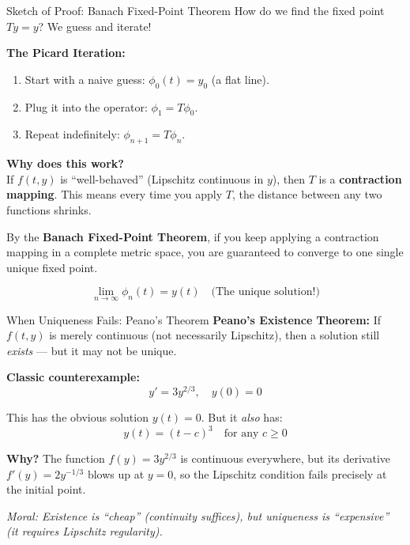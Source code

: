 \begin{frame}{Sketch of Proof: Banach Fixed-Point Theorem}
How do we find the fixed point $Ty = y$? We guess and iterate!

\textbf{The Picard Iteration:}
\begin{enumerate}
    \item Start with a naive guess: $\phi_0(t) = y_0$ (a flat line).
    \item Plug it into the operator: $\phi_1 = T\phi_0$.
    \item Repeat indefinitely: $\phi_{n+1} = T\phi_n$.
\end{enumerate}

\textbf{Why does this work?} \\
If $f(t, y)$ is ``well-behaved'' (Lipschitz continuous in $y$), then $T$ is a \textbf{contraction mapping}. This means every time you apply $T$, the distance between any two functions shrinks.

By the \textbf{Banach Fixed-Point Theorem}, if you keep applying a contraction mapping in a complete metric space, you are guaranteed to converge to one single unique fixed point.

\[
\lim_{n \to \infty} \phi_n(t) = y(t) \quad \text{(The unique solution!)}
\]
\end{frame}


\begin{frame}{When Uniqueness Fails: Peano's Theorem}
\textbf{Peano's Existence Theorem:} If $f(t, y)$ is merely continuous (not necessarily Lipschitz), then a solution still \emph{exists} --- but it may not be unique.

\vspace{0.4cm}

\textbf{Classic counterexample:}
\[
y' = 3y^{2/3}, \quad y(0) = 0
\]

This has the obvious solution $y(t) = 0$. But it \emph{also} has:
\[
y(t) = (t - c)^3 \quad \text{for any } c \geq 0
\]

\vspace{0.3cm}
\textbf{Why?} The function $f(y) = 3y^{2/3}$ is continuous everywhere, but its derivative $f'(y) = 2y^{-1/3}$ blows up at $y=0$, so the Lipschitz condition fails precisely at the initial point.

\vspace{0.3cm}
\textit{Moral: Existence is ``cheap'' (continuity suffices), but uniqueness is ``expensive'' (it requires Lipschitz regularity).}
\end{frame}
